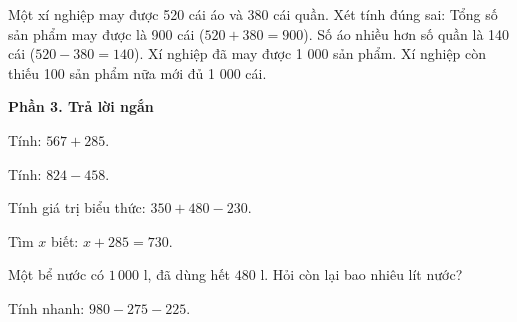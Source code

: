 \begin{ex} %
Một xí nghiệp may được 520 cái áo và 380 cái quần. Xét tính đúng sai:
\choiceTF
{\True Tổng số sản phẩm may được là 900 cái ($520 + 380 = 900$).}
{\True Số áo nhiều hơn số quần là 140 cái ($520 - 380 = 140$).}
{Xí nghiệp đã may được 1 000 sản phẩm.}
{\True Xí nghiệp còn thiếu 100 sản phẩm nữa mới đủ 1 000 cái.}
\end{ex}

\textbf{Phần 3. Trả lời ngắn}

\begin{ex} %
Tính: $567 + 285$.
\end{ex}

\begin{ex} %
Tính: $824 - 458$.
\end{ex}

\begin{ex} %
Tính giá trị biểu thức: $350 + 480 - 230$.
\end{ex}

\begin{ex} %
Tìm $x$ biết: $x + 285 = 730$.
\end{ex}

\begin{ex} %
Một bể nước có $1\,000\text{ l}$, đã dùng hết $480\text{ l}$. Hỏi còn lại bao nhiêu lít nước?
\end{ex}

\begin{ex} %
Tính nhanh: $980 - 275 - 225$.
\end{ex}
